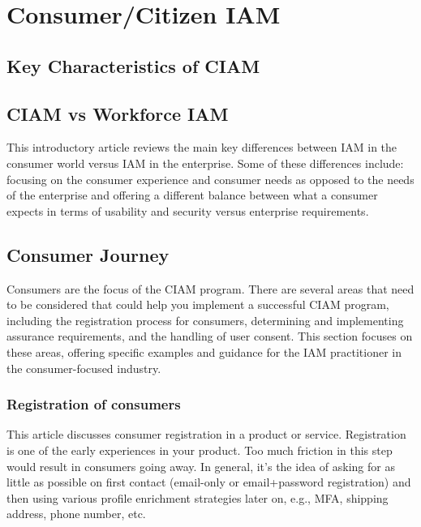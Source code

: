 \hypertarget{consumercitizen-iam}{%
\chapter{Consumer/Citizen IAM}\label{consumercitizen-iam}}

\hypertarget{key-characteristics-of-ciam}{%
\section{Key Characteristics of
CIAM}\label{key-characteristics-of-ciam}}

\hypertarget{ciam-vs-workforce-iam}{%
\section{CIAM vs Workforce IAM}\label{ciam-vs-workforce-iam}}

This introductory article reviews the main key differences between IAM
in the consumer world versus IAM in the enterprise. Some of these
differences include: focusing on the consumer experience and consumer
needs as opposed to the needs of the enterprise and offering a different
balance between what a consumer expects in terms of usability and
security versus enterprise requirements.

\hypertarget{consumer-journey}{%
\section{Consumer Journey}\label{consumer-journey}}

Consumers are the focus of the CIAM program. There are several areas
that need to be considered that could help you implement a successful
CIAM program, including the registration process for consumers,
determining and implementing assurance requirements, and the handling of
user consent. This section focuses on these areas, offering specific
examples and guidance for the IAM practitioner in the consumer-focused
industry.

\hypertarget{registration-of-consumers}{%
\subsection{Registration of
consumers}\label{registration-of-consumers}}

This article discusses consumer registration in a product or service.
Registration is one of the early experiences in your product. Too much
friction in this step would result in consumers going away. In general,
it's the idea of asking for as little as possible on first contact
(email-only or email+password registration) and then using various
profile enrichment strategies later on, e.g., MFA, shipping address,
phone number, etc.

